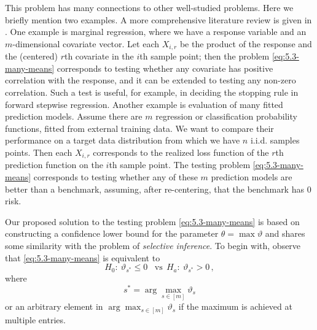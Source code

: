 \documentclass[11pt]{article}
\theoremstyle{plain}
\begin{document}
This problem has many connections to other well-studied problems. Here we briefly mention two examples. A more comprehensive literature review is given in .  One example is marginal regression, where we have a response variable and an $m$-dimensional covariate vector.  Let each $X_{i,r}$ be the product of the response and the (centered) $r$th covariate in the $i$th sample point; then the problem \eqref{eq:5.3-many-means} corresponds to testing whether any covariate has positive correlation with the response, and it can be extended to testing any non-zero correlation. Such a test is useful, for example, in deciding the stopping rule in forward stepwise regression. Another example is evaluation of many fitted prediction models.  Assume there are $m$ regression or classification probability functions, fitted from external training data.  We want to compare their performance on a target data distribution from which we have $n$ i.i.d. samples points.  Then each $X_{i,r}$ corresponds to the realized loss function of the $r$th prediction function on the $i$th sample point. The testing problem \eqref{eq:5.3-many-means} corresponds to testing whether any of these $m$ prediction models are better than a benchmark, assuming, after re-centering, that the benchmark has $0$ risk.

Our proposed solution to the testing problem \eqref{eq:5.3-many-means} is based on constructing a confidence lower bound for the parameter $\theta=\max\vartheta$ and shares some similarity with the problem of \emph{selective inference}. To begin with, observe that \eqref{eq:5.3-many-means} is equivalent to
$$
H_0:~\vartheta_{s^*}\le 0\,~~~\text{vs}~~ H_a:~\vartheta_{s^*}>0\,,
$$
where
$$s^*=\arg\max_{s\in[m]}\vartheta_s$$
or an arbitrary element in $\arg\max_{s\in[m]}\vartheta_s$ if the maximum is achieved at multiple entries.
\end{document}
